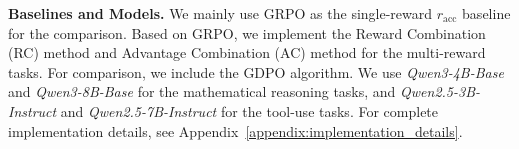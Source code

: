 
\textbf{Baselines and Models.} We mainly use GRPO \citep{grpo} as the single-reward $r_\text{acc}$ baseline for the comparison. Based on GRPO, we implement the Reward Combination (RC) method and Advantage Combination (AC) method for the multi-reward tasks. For comparison, we include the GDPO \citep{gdpo} algorithm. We use \textit{Qwen3-4B-Base} and \textit{Qwen3-8B-Base} \citep{qwen3} for the mathematical reasoning tasks, and \textit{Qwen2.5-3B-Instruct} and \textit{Qwen2.5-7B-Instruct} \citep{qwen2.5} for the tool-use tasks. For complete implementation details, see Appendix~\ref{appendix:implementation_details}.

